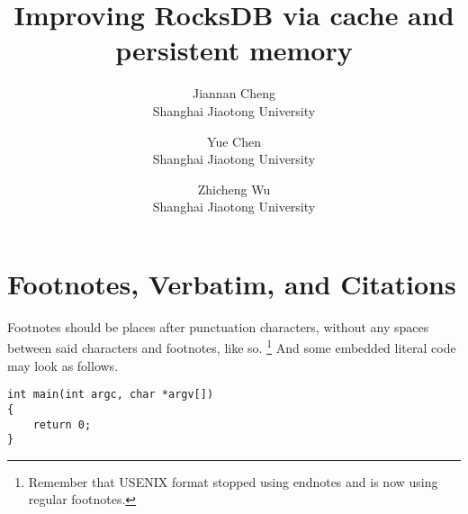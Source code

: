 \documentclass[letterpaper,twocolumn,10pt]{article}
\begin{document}

\date{}

\title{\Large \bf Improving RocksDB via cache and persistent memory}

\author{
{\rm Jiannan Cheng}\\
Shanghai Jiaotong University
\and
{\rm Yue Chen}\\
Shanghai Jiaotong University
\and
{\rm Zhicheng Wu}\\
Shanghai Jiaotong University
} %

\maketitle








\section{Footnotes, Verbatim, and Citations}

Footnotes should be places after punctuation characters, without any
spaces between said characters and footnotes, like so.%
\footnote{Remember that USENIX format stopped using endnotes and is
  now using regular footnotes.} And some embedded literal code may
look as follows.

\begin{verbatim}
int main(int argc, char *argv[]) 
{
    return 0;
}
\end{verbatim}
\end{document}
